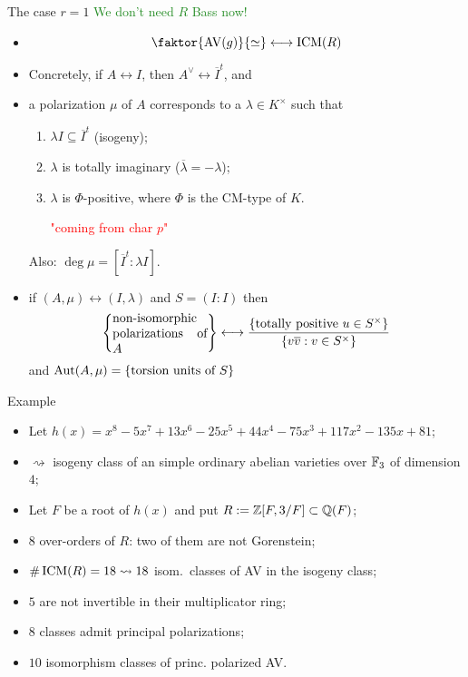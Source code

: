 \documentclass[usenames,dvipsnames,handout]{beamer}
\DeclareMathOperator{\AV}{AV}
\newcommand{\green}[1]{\textcolor{ForestGreen}{#1}}
\begin{document}
\begin{frame}{ The case $r=1$ }
\pause \green{We don't need $R$ Bass now! }
\pause 
\begin{itemize}
 \item \[ \faktor{\AV(g)}{\simeq} \longleftrightarrow \ICM(R) \]
\pause \item Concretely, if $A\leftrightarrow I$, then $A^\vee \leftrightarrow \overline{I}^t$, and
\pause \item a polarization $\mu$ of $A$ corresponds to a $\lambda\in K^\times$ such that
      \begin{enumerate}[-]
\pause \item $\lambda I \subseteq \overline{I}^t$ (isogeny);
\pause \item $\lambda$ is totally imaginary ($\overline \lambda = -\lambda$);
\pause \item $\lambda$ is $\Phi$-positive, where $\Phi$ is the CM-type of $K$. \textcolor{red}{\parbox{6em}{\center "coming from char $p$"}}
      \end{enumerate} 
\pause Also: $\deg \mu= [\overline{I}^t : \lambda I]$.
\pause  \item if $(A,\mu) \leftrightarrow (I,\lambda)$ and $S=(I:I)$ then
  \[\set{\parbox[p]{7.5em}{non-isomorphic polarizations of $A$}} \longleftrightarrow \dfrac{\set{\text{totally positive }u\in S^\times }}{\set{v\overline{v}: v\in S^\times}}\]
  and $\operatorname{Aut}(A,\mu) = \left\lbrace\text{torsion units of $S$}\right\rbrace$
\end{itemize}

\end{frame}

\begin{frame}{ Example}
\begin{itemize}
 \item Let $h(x)=x^8 - 5x^7 + 13x^6 - 25x^5 + 44x^4 - 75x^3 + 117x^2 - 135x + 81$;
 \item $\rightsquigarrow$ isogeny class of an simple ordinary abelian varieties over $\mathbb{F}_{3}$ of dimension $4$;
 \item Let $F$ be a root of $h(x)$ and put $R:=\mathbb{Z}[F,3/F]\subset \mathbb{Q}(F)$;
 \item $8$ over-orders of $R$: two of them are not Gorenstein;
 \item $\#\operatorname{ICM}(R) = 18 \rightsquigarrow 18$ isom.~classes of AV in the isogeny class;
 \item $5$ are not invertible in their multiplicator ring;
 \item $8$ classes admit principal polarizations;
 \item $10$ isomorphism classes of princ. polarized AV.
\end{itemize}
\end{frame}
\end{document}
